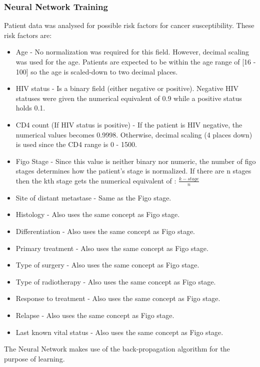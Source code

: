 	\subsubsection{Neural Network Training}
	Patient data was analysed for possible risk factors for cancer susceptibility. These risk factors are:
	\begin{itemize} %
		\item Age - No normalization was required for this field. However, decimal scaling was used for the age. Patients are expected to be within the age range of [16 - 100] so the age is scaled-down to two decimal places.
		\item HIV status - Is a binary field (either negative or positive). Negative HIV statuses were given the numerical equivalent of 0.9 while a positive status holds 0.1.
		\item CD4 count (If HIV status is positive) - If the patient is HIV negative, the numerical values becomes 0.9998. Otherwise, decimal scaling (4 places down) is used since the CD4 range is 0 - 1500.  
		\item Figo Stage - Since this value is neither binary nor numeric, the number of figo stages determines how the patient's stage is normalized. If there are n stages then the kth stage gets the numerical equivalent of : \(\frac{k-stage}{n}\)
		\item Site of distant metastase - Same as the Figo stage. 
		\item Histology - Also uses the same concept as Figo stage.
		\item Differentiation - Also uses the same concept as Figo stage.
		\item Primary treatment -  Also uses the same concept as Figo stage.
		\item Type of surgery - Also uses the same concept as Figo stage.
		\item Type of radiotherapy - Also uses the same concept as Figo stage.
		\item Response to treatment - Also uses the same concept as Figo stage.
		\item Relapse - Also uses the same concept as Figo stage.
		\item Last known vital status - Also uses the same concept as Figo stage.
		
	\end{itemize}
	
	The Neural Network makes use of the back-propagation algorithm for the purpose of learning.

